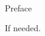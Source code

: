 \pagestyle{plain} \setcounter{page}{2}
\renewcommand{\baselinestretch}{2}
\small\normalsize
\hbox{\ }

\vspace{.5in}

\begin{center}
\large{Preface}
\end{center}


If needed.
